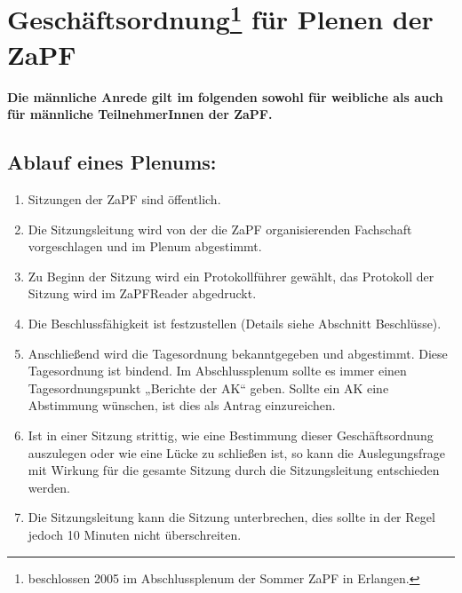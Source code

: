 




\chapter*{Geschäftsordnung\footnote{beschlossen 2005 im Abschlussplenum der Sommer ZaPF in Erlangen.} für Plenen der ZaPF}


\noindent \textbf{Die männliche Anrede gilt im folgenden sowohl für
weibliche als auch für männliche
 TeilnehmerInnen der ZaPF.}

\section{Ablauf eines Plenums:}
\begin{enumerate}

\item{Sitzungen der ZaPF sind öffentlich.}

\item{Die Sitzungsleitung wird von der die ZaPF organisierenden Fachschaft vorgeschlagen und im
Plenum abgestimmt.}

\item{Zu Beginn der Sitzung wird ein Protokollführer gewählt, das Protokoll der Sitzung wird im ZaPFReader
abgedruckt.}

\item{Die Beschlussfähigkeit ist festzustellen (Details siehe Abschnitt Beschlüsse).}

\item{Anschließend wird die Tagesordnung bekanntgegeben und abgestimmt. Diese Tagesordnung ist
bindend. Im Abschlussplenum sollte es immer einen Tagesordnungspunkt „Berichte der AK“ geben.
Sollte ein AK eine Abstimmung wünschen, ist dies als Antrag einzureichen.}

\item{ Ist in einer Sitzung strittig, wie eine Bestimmung dieser Geschäftsordnung auszulegen oder wie eine
Lücke zu schließen ist, so kann die Auslegungsfrage mit Wirkung für die gesamte Sitzung durch die
Sitzungsleitung entschieden werden.}

\item{Die Sitzungsleitung kann die Sitzung unterbrechen, dies sollte in der Regel jedoch 10 Minuten nicht
überschreiten.}
\end{enumerate}

